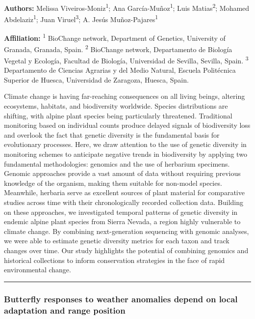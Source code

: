 \documentclass[
  letterpaper,
  DIV=11,
  numbers=noendperiod]{scrartcl}
\begin{document}
\textbf{Authors:} Melissa Viveiros-Moniz\textsuperscript{1}; Ana
García-Muñoz\textsuperscript{1}; Luis Matias\textsuperscript{2}; Mohamed
Abdelaziz\textsuperscript{1}; Juan Viruel\textsuperscript{3}; A. Jesús
Muñoz-Pajares\textsuperscript{1}

\textbf{Affiliation:} \textsuperscript{1} BioChange network, Department
of Genetics, University of Granada, Granada, Spain. \textsuperscript{2}
BioChange network, Departamento de Biología Vegetal y Ecología, Facultad
de Biología, Universidad de Sevilla, Sevilla, Spain. \textsuperscript{3}
Departamento de Ciencias Agrarias y del Medio Natural, Escuela
Politécnica Superior de Huesca, Universidad de Zaragoza, Huesca, Spain.

Climate change is having far-reaching consequences on all living beings,
altering ecosystems, habitats, and biodiversity worldwide. Species
distributions are shifting, with alpine plant species being particularly
threatened. Traditional monitoring based on individual counts produce
delayed signals of biodiversity loss and overlook the fact that genetic
diversity is the fundamental basis for evolutionary processes. Here, we
draw attention to the use of genetic diversity in monitoring schemes to
anticipate negative trends in biodiversity by applying two fundamental
methodologies: genomics and the use of herbarium specimens. Genomic
approaches provide a vast amount of data without requiring previous
knowledge of the organism, making them suitable for non-model species.
Meanwhile, herbaria serve as excellent sources of plant material for
comparative studies across time with their chronologically recorded
collection data. Building on these approaches, we investigated temporal
patterns of genetic diversity in endemic alpine plant species from
Sierra Nevada, a region highly vulnerable to climate change. By
combining next-generation sequencing with genomic analyses, we were able
to estimate genetic diversity metrics for each taxon and track changes
over time. Our study highlights the potential of combining genomics and
historical collections to inform conservation strategies in the face of
rapid environmental change.

\begin{center}\rule{0.5\linewidth}{0.5pt}\end{center}

\subsubsection{Butterfly responses to weather anomalies depend on local
adaptation and range
position}\label{butterfly-responses-to-weather-anomalies-depend-on-local-adaptation-and-range-position}
\end{document}
